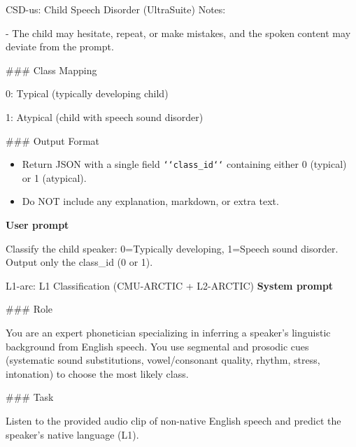 {\begin{promptbox}{CSD-us: Child Speech Disorder (UltraSuite)}
Notes:
\par
\hspace*{1em}- The child may hesitate, repeat, or make mistakes, and the spoken content may deviate from the prompt.
\par\vspace{2pt}

\noindent\#\#\# Class Mapping
\par
\hspace*{1em}0: Typical (typically developing child)\par
\hspace*{1em}1: Atypical (child with speech sound disorder)
\par\vspace{2pt}

\noindent\#\#\# Output Format
\par
\begin{itemize}[leftmargin=*,noitemsep,topsep=2pt]
  \item Return JSON with a single field \texttt{\string`\string`class\_id\string`\string`} containing either 0 (typical) or 1 (atypical).
  \item Do NOT include any explanation, markdown, or extra text.
\end{itemize}

\par\vspace{2pt}
\textbf{User prompt}\par\vspace{2pt}
\noindent
Classify the child speaker: 0=Typically developing, 1=Speech sound disorder. Output only the class\_id (0 or 1).
\end{promptbox}

\par\vspace{4pt}
\begin{promptbox}{L1-arc: L1 Classification (CMU-ARCTIC + L2-ARCTIC)}
\textbf{System prompt}\par\vspace{2pt}
\noindent\#\#\# Role
\par
You are an expert phonetician specializing in inferring a speaker's linguistic background from English speech. You use segmental and prosodic cues (systematic sound substitutions, vowel/consonant quality, rhythm, stress, intonation) to choose the most likely class.
\par\vspace{2pt}

\noindent\#\#\# Task
\par
Listen to the provided audio clip of non-native English speech and predict the speaker's native language (L1).
\par\vspace{2pt}


\end{promptbox}}
